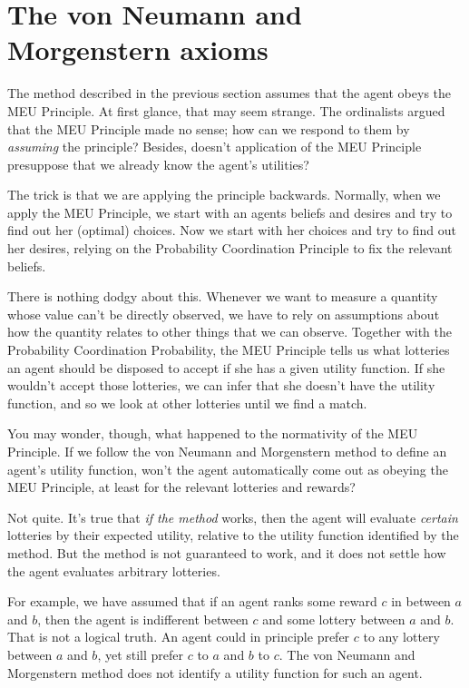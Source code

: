 \section{The von Neumann and Morgenstern axioms}\label{sec:vnm}

The method described in the previous section assumes that the agent
obeys the MEU Principle. At first glance, that may seem strange. The
ordinalists argued that the MEU Principle made no sense; how can we
respond to them by \emph{assuming} the principle? Besides, doesn't
application of the MEU Principle presuppose that we already know the
agent's utilities?

The trick is that we are applying the principle backwards. Normally,
when we apply the MEU Principle, we start with an agents beliefs and
desires and try to find out her (optimal) choices. Now we start with her
choices and try to find out her desires, relying on the Probability
Coordination Principle to fix the relevant beliefs.

There is nothing dodgy about this. Whenever we want to measure a
quantity whose value can't be directly observed, we have to rely on
assumptions about how the quantity relates to other things that we can
observe. Together with the Probability Coordination Probability, the
MEU Principle tells us what lotteries an agent should be disposed to
accept if she has a given utility function. If she wouldn't accept
those lotteries, we can infer that she doesn't have the utility
function, and so we look at other lotteries until we find a match.

You may wonder, though, what happened to the normativity of the MEU
Principle. If we follow the von Neumann and Morgenstern method to
define an agent's utility function, won't the agent automatically come
out as obeying the MEU Principle, at least for the relevant lotteries
and rewards? 

Not quite. It's true that \emph{if the method} works, then the agent
will evaluate \emph{certain} lotteries by their expected utility,
relative to the utility function identified by the method. But the
method is not guaranteed to work, and it does not settle how the agent
evaluates arbitrary lotteries.

For example, we have assumed that if an agent ranks some reward $c$ in
between $a$ and $b$, then the agent is indifferent between $c$ and
some lottery between $a$ and $b$. That is not a logical truth. An
agent could in principle prefer $c$ to any lottery between $a$ and
$b$, yet still prefer $c$ to $a$ and $b$ to $c$. The von Neumann and
Morgenstern method does not identify a utility function for such an
agent.

